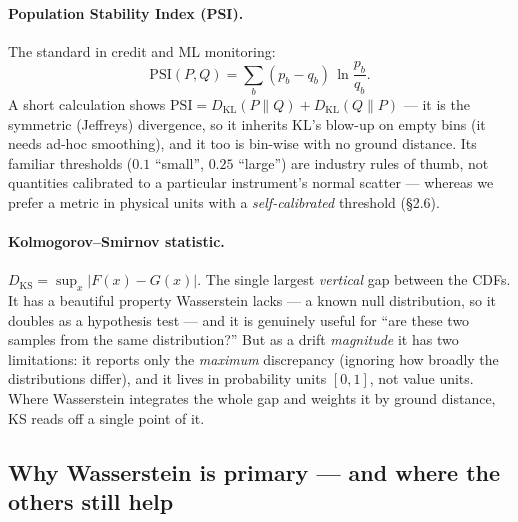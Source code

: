 \documentclass[11pt]{article}
\theoremstyle{definition}
\begin{document}
\paragraph{Population Stability Index (PSI).} The standard in credit and ML monitoring:
\begin{equation}
  \mathrm{PSI}(P, Q) = \sum_b (p_b - q_b)\,\ln\frac{p_b}{q_b}.
\end{equation}
A short calculation shows $\mathrm{PSI} = D_{\mathrm{KL}}(P\|Q) + D_{\mathrm{KL}}(Q\|P)$ --- it is the
symmetric (Jeffreys) divergence, so it inherits KL's blow-up on empty bins (it needs ad-hoc
smoothing), and it too is bin-wise with no ground distance. Its familiar thresholds ($0.1$ ``small'',
$0.25$ ``large'') are industry rules of thumb, not quantities calibrated to a particular instrument's
normal scatter --- whereas we prefer a metric in physical units with a \emph{self-calibrated}
threshold (\S2.6).

\paragraph{Kolmogorov--Smirnov statistic.}
$D_{\mathrm{KS}} = \sup_x | F(x) - G(x) |$. The single largest \emph{vertical} gap between the CDFs.
It has a beautiful property Wasserstein lacks --- a known null distribution, so it doubles as a
hypothesis test --- and it is genuinely useful for ``are these two samples from the same
distribution?'' But as a drift \emph{magnitude} it has two limitations: it reports only the
\emph{maximum} discrepancy (ignoring how broadly the distributions differ), and it lives in
probability units $[0,1]$, not value units. Where Wasserstein integrates the whole gap and weights it
by ground distance, KS reads off a single point of it.

\subsection{Why Wasserstein is primary --- and where the others still help}
\end{document}
